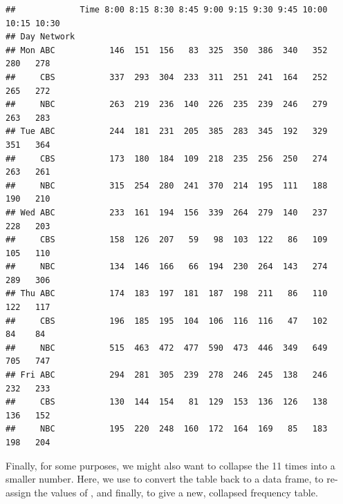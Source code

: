 \documentclass[11pt]{book}
\renewenvironment{knitrout}{\small\renewcommand{\baselinestretch}{.85}}{} %
\begin{document}
\begin{knitrout}\footnotesize
{}\color{fgcolor}\begin{kframe}
\begin{alltt}
 \hlkwb{<-} \hlstd{TV[,,}\hlopt{:}\hlstd{,]}     
 \hlkwb{<-} \hlstd{TV[,,,}\hlstd{]}       
\end{alltt}
\begin{verbatim}
##             Time 8:00 8:15 8:30 8:45 9:00 9:15 9:30 9:45 10:00 10:15 10:30
## Day Network                                                               
## Mon ABC           146  151  156   83  325  350  386  340   352   280   278
##     CBS           337  293  304  233  311  251  241  164   252   265   272
##     NBC           263  219  236  140  226  235  239  246   279   263   283
## Tue ABC           244  181  231  205  385  283  345  192   329   351   364
##     CBS           173  180  184  109  218  235  256  250   274   263   261
##     NBC           315  254  280  241  370  214  195  111   188   190   210
## Wed ABC           233  161  194  156  339  264  279  140   237   228   203
##     CBS           158  126  207   59   98  103  122   86   109   105   110
##     NBC           134  146  166   66  194  230  264  143   274   289   306
## Thu ABC           174  183  197  181  187  198  211   86   110   122   117
##     CBS           196  185  195  104  106  116  116   47   102    84    84
##     NBC           515  463  472  477  590  473  446  349   649   705   747
## Fri ABC           294  281  305  239  278  246  245  138   246   232   233
##     CBS           130  144  154   81  129  153  136  126   138   136   152
##     NBC           195  220  248  160  172  164  169   85   183   198   204
\end{verbatim}
\end{kframe}
\end{knitrout}

Finally, for some purposes, we might also want to collapse the 11 times into a smaller number.
Here, we use  to convert the table back to a data frame,
  to re-assign the values of ,
 and finally,  to give a new, collapsed frequency table.
\end{document}

